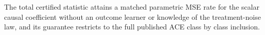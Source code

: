The total certified statistic attains a matched parametric MSE rate for the scalar causal coefficient without an outcome learner or knowledge of the treatment-noise law, and its guarantee restricts to the full published ACE class by class inclusion.